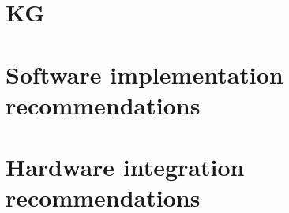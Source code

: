 \documentclass[11pt]{article}
\begin{document}
\section{KG}
\label{sec:org9b2ab16}
\section{Software implementation recommendations}
\label{sec:org09455ed}
\section{Hardware integration recommendations}
\label{sec:org2f6b776}
\end{document}
